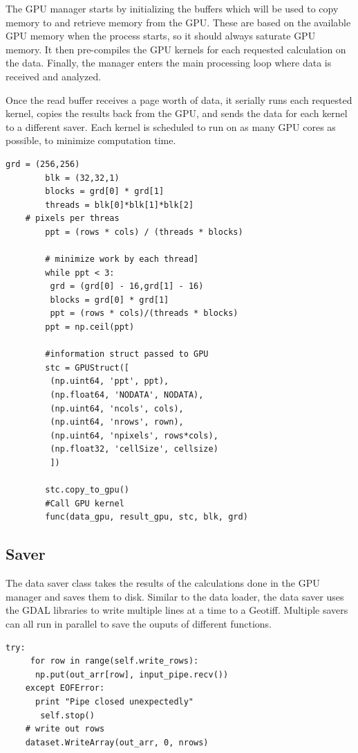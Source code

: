 \documentclass[journal]{IEEEtran}
\begin{document}
    The GPU manager starts by initializing the buffers which will be used to
    copy memory to and retrieve memory from the GPU. These are based on the
    available GPU memory when the process starts, so it should always saturate
    GPU memory. It then pre-compiles the GPU kernels for each requested
    calculation on the data. Finally, the manager enters the main processing loop
    where data is received and analyzed.

    Once the read buffer receives a page worth of data, it serially runs each
    requested kernel, copies the results back from the GPU, and sends the data
    for each kernel to a different saver. Each kernel is scheduled to run on
    as many GPU cores as possible, to minimize computation time.

    \begin{Verbatim}[frame=single, gobble=8]
        grd = (256,256)
        blk = (32,32,1)
        blocks = grd[0] * grd[1]
        threads = blk[0]*blk[1]*blk[2]
	# pixels per threas
        ppt = (rows * cols) / (threads * blocks)    

        # minimize work by each thread]
        while ppt < 3:
         grd = (grd[0] - 16,grd[1] - 16)
         blocks = grd[0] * grd[1]
         ppt = (rows * cols)/(threads * blocks)
        ppt = np.ceil(ppt)   
        
        #information struct passed to GPU
        stc = GPUStruct([
         (np.uint64, 'ppt', ppt),
         (np.float64, 'NODATA', NODATA),
         (np.uint64, 'ncols', cols),
         (np.uint64, 'nrows', rown),
         (np.uint64, 'npixels', rows*cols),
         (np.float32, 'cellSize', cellsize)
         ])

        stc.copy_to_gpu()
        #Call GPU kernel
        func(data_gpu, result_gpu, stc, blk, grd)
\end{Verbatim}

    \subsection{Saver}
    The data saver class takes the results of the calculations done in the GPU
    manager and saves them to disk. Similar to the data loader, the data saver
    uses the GDAL libraries to write multiple lines at a time to a Geotiff.
    Multiple savers can all run in parallel to save the ouputs of different
    functions.
\break
    \begin{Verbatim}[frame=single, gobble=4]
    try:
     for row in range(self.write_rows):
      np.put(out_arr[row], input_pipe.recv())
    except EOFError:
      print "Pipe closed unexpectedly"
       self.stop()
    # write out rows
    dataset.WriteArray(out_arr, 0, nrows)
\end{Verbatim}
\end{document}
